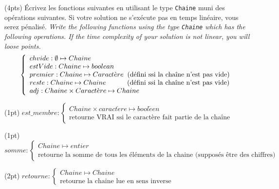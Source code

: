 \documentclass[10pt]{article}\usepackage[nu]{esial}
\begin{document}
\Exercice(4pts) Écrivez les fonctions suivantes en utilisant le type
\texttt{Chaine} muni des opérations suivantes. Si votre solution ne s'exécute
pas en temps linéaire, vous serez pénalisé. \textit{Write the following
  functions using the type \texttt{Chaine} which has the following
  operations. If the time complexity of your solution is not linear, you will
  loose points.}
$$\left\{
\begin{array}{l}
  chvide:  \emptyset\mapsto Chaine\\
  estVide: Chaine\mapsto boolean\\
  premier: Chaine\mapsto Caract\grave{e}re \;\;\text{(défini ssi la chaîne 
    n'est pas vide)}\\
  reste:   Chaine\mapsto Chaine \text{\hspace{11mm}(défini ssi la chaîne 
    n'est pas vide)}\\
  adj:     Chaine\times Caract\grave{e}re \mapsto Chaine
\end{array}\right.
$$

\begin{Question}(1pt)
  $est\_membre: \left\{
    \begin{array}{l}
      Chaine\times caract\grave{e}re\mapsto bool\acute{e}en\\
      \text{retourne VRAI ssi le caractère fait partie de la chaîne}
    \end{array}\right.$  
\end{Question}

\begin{Question}(1pt)
  $somme: \left\{
    \begin{array}{l}
      Chaine\mapsto entier\\
      \text{retourne la somme de tous les éléments de la chaine (supposés
        être des chiffres)}
    \end{array}\right.$  
\end{Question}


\begin{Question}(2pt)
  $retourne: \left\{
    \begin{array}{l}
      Chaine\mapsto Chaine\\
      \text{retourne la chaine lue en sens inverse}
    \end{array}\right.$  
\end{Question}
\end{document}
